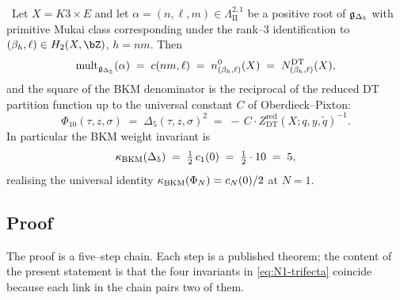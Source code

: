\begin{theorem}[$N=1$: BKM--BPS--DT trifecta for $K3 \times E$]
\label{thm:N1-bkm-bps-dt}
\ClaimStatusTheorem\ Let $X = K3 \times E$ and let $\alpha = (n, \ell, m) \in
\Lambda^{2,1}_{\mathrm{II}}$ be a positive root of $\mathfrak{g}_{\Delta_5}$ with primitive
Mukai class corresponding under the rank--$3$ identification to
$(\beta_h, \ell) \in H_2(X, \bZ)$, $h = nm$. Then
\begin{equation}
\label{eq:N1-trifecta}
\mathrm{mult}_{\mathfrak{g}_{\Delta_5}}(\alpha) \;=\; c(nm, \ell) \;=\; n^0_{(\beta_h, \ell)}(X) \;=\; N^{\mathrm{DT}}_{(\beta_h, \ell)}(X),
\end{equation}
and the square of the BKM denominator is the reciprocal of the reduced DT
partition function up to the universal constant $C$ of Oberdieck--Pixton:
\begin{equation}
\label{eq:N1-Phi10-ZDT}
\Phi_{10}(\tau, z, \sigma) \;=\; \Delta_5(\tau, z, \sigma)^2 \;=\; -\,C \cdot Z^{\mathrm{red}}_{\mathrm{DT}}(X; q, y, \widetilde q)^{-1}.
\end{equation}
In particular the BKM weight invariant is
\[
\kappa_{\mathrm{BKM}}(\Delta_5) \;=\; \tfrac{1}{2}\, c_1(0) \;=\; \tfrac{1}{2} \cdot 10 \;=\; 5,
\]
realising the universal identity $\kappa_{\mathrm{BKM}}(\Phi_N) = c_N(0)/2$ at $N=1$.
\end{theorem}

\subsection{Proof}

The proof is a five--step chain. Each step is a published theorem; the content
of the present statement is that the four invariants in \eqref{eq:N1-trifecta}
coincide because each link in the chain pairs two of them.

